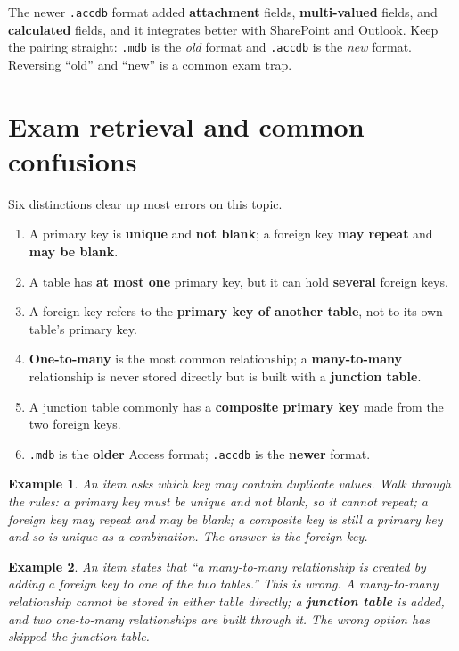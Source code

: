 \documentclass[11pt]{article}
\newtheorem{example}{Example}[section]
\begin{document}
The newer \texttt{.accdb} format added \textbf{attachment} fields,
\textbf{multi-valued} fields, and \textbf{calculated} fields, and it integrates
better with SharePoint and Outlook. Keep the pairing straight: \texttt{.mdb}
is the \emph{old} format and \texttt{.accdb} is the \emph{new} format.
Reversing ``old'' and ``new'' is a common exam trap.

\section{Exam retrieval and common confusions}
Six distinctions clear up most errors on this topic.
\begin{enumerate}
  \item A primary key is \textbf{unique} and \textbf{not blank}; a foreign key
    \textbf{may repeat} and \textbf{may be blank}.
  \item A table has \textbf{at most one} primary key, but it can hold
    \textbf{several} foreign keys.
  \item A foreign key refers to the \textbf{primary key of another table}, not
    to its own table's primary key.
  \item \textbf{One-to-many} is the most common relationship; a
    \textbf{many-to-many} relationship is never stored directly but is built
    with a \textbf{junction table}.
  \item A junction table commonly has a \textbf{composite primary key} made
    from the two foreign keys.
  \item \texttt{.mdb} is the \textbf{older} Access format; \texttt{.accdb} is
    the \textbf{newer} format.
\end{enumerate}

\begin{example}
An item asks which key may contain duplicate values. Walk through the rules: a
primary key must be unique and not blank, so it cannot repeat; a foreign key
may repeat and may be blank; a composite key is still a primary key and so is
unique as a combination. The answer is the foreign key.
\end{example}

\begin{example}
An item states that ``a many-to-many relationship is created by adding a
foreign key to one of the two tables.'' This is wrong. A many-to-many
relationship cannot be stored in either table directly; a \textbf{junction
table} is added, and two one-to-many relationships are built through it. The
wrong option has skipped the junction table.
\end{example}
\end{document}
